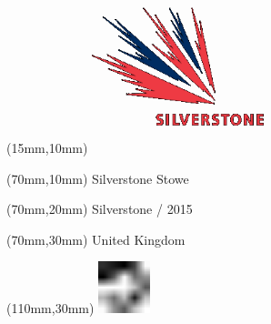 \null\newpage
\begin{textblock*}{50mm}(15mm,10mm)%
\includegraphics[width=50mm]{LG/SIL.png}
\end{textblock*}
\begin{textblock*}{130mm}(70mm,10mm)%
{\fontsize{20}{20}\selectfont Silverstone Stowe}\\
\end{textblock*}
\begin{textblock*}{120mm}(70mm,20mm)%
{\fontsize{16}{16}\selectfont Silverstone / 2015}\\
\end{textblock*}
\begin{textblock*}{120mm}(70mm,30mm)%
{\fontsize{12}{12}\selectfont United Kingdom}
\end{textblock*}
\begin{textblock*}{30mm}(110mm,30mm)%
\centering
\includegraphics[height=15mm]{icons/fa-rotate-left.pdf}
\end{textblock*}
